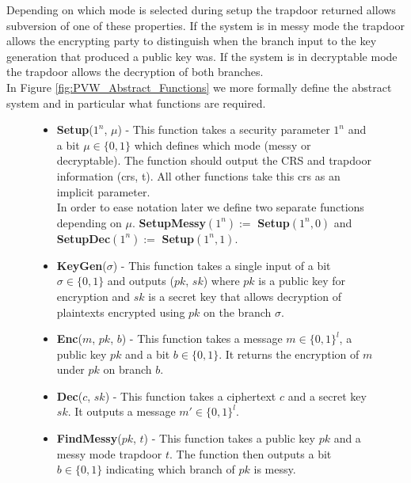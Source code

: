 \documentclass[ %
                    author={Nicholas Tutte},
                supervisor={Prof. Nigel Smart},
                    degree={MEng},
                     title={Secure Two Party Computation},
                  subtitle={A practical comparison of recent protocols},
                      type={Research - GG1K},
                      year={2015} ]{dissertation}
\begin{document}
					{Depending on which mode is selected during setup the trapdoor returned allows subversion of one of these properties. If the system is in messy mode the trapdoor allows the encrypting party to distinguish when the branch input to the key generation that produced a public key was. If the system is in decryptable mode the trapdoor allows the decryption of both branches.}\\

					{In Figure \ref{fig:PVW_Abstract_Functions} we more formally define the abstract system and in particular what functions are required.}\\

					\begin{figure}[!htb]
						\begin{mdframed}
							\centering
							\begin{itemize}
								\item \textbf{Setup}($1^n$, $\mu$) - This function takes a security parameter $1^n$ and a bit $\mu \in \{0, 1\}$ which defines which mode (messy or decryptable). The function should output the CRS and trapdoor information (crs, t). All other functions take this crs as an implicit parameter.\\[0.25cm]

								In order to ease notation later we define two separate functions depending on $\mu$. \textbf{SetupMessy}$(1^n) :=$ \textbf{Setup}$(1^n, 0)$ and \textbf{SetupDec}$(1^n) :=$ \textbf{Setup}$(1^n, 1)$.\\[0.25cm]


								\item \textbf{KeyGen}($\sigma$) - This function takes a single input of a bit $\sigma \in \{0, 1\}$ and outputs ($pk$, $sk$) where $pk$ is a public key for encryption and $sk$ is a secret key that allows decryption of plaintexts encrypted using $pk$ on the branch $\sigma$.

								\item \textbf{Enc}($m$, $pk$, $b$) - This function takes a message $m \in \{0, 1\}^l$, a public key $pk$ and a bit $b \in \{0, 1\}$. It returns the encryption of $m$ under $pk$ on branch $b$.

								\item \textbf{Dec}($c$, $sk$) - This function takes a ciphertext $c$ and a secret key $sk$. It outputs a message $m' \in \{0, 1\}^l$.

								\item \textbf{FindMessy}($pk$, $t$) - This function takes a public key $pk$ and a messy mode trapdoor $t$. The function then outputs a bit $b \in \{0, 1\}$ indicating which branch of $pk$ is messy.


\end{itemize}
\end{mdframed}
\end{figure}
\end{document}
